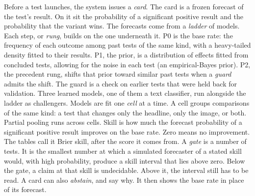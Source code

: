 \documentclass[sigconf,nonacm]{acmart}
\begin{document}
Before a test launches, the system issues a \emph{card}. The card is a frozen forecast of the test's result. On it sit the probability of a significant positive result and the probability that the variant wins. The forecasts come from a \emph{ladder} of models. Each step, or \emph{rung}, builds on the one underneath it. P0 is the base rate: the frequency of each outcome among past tests of the same kind, with a heavy-tailed density fitted to their results. P1, the prior, is a distribution of effects fitted from concluded tests, allowing for the noise in each test (an empirical-Bayes prior). P2, the precedent rung, shifts that prior toward similar past tests when a \emph{guard} admits the shift. The guard is a check on earlier tests that were held back for validation. Three learned models, one of them a text classifier, run alongside the ladder as challengers. Models are fit one \emph{cell} at a time. A cell groups comparisons of the same kind: a test that changes only the headline, only the image, or both. Partial pooling runs across cells. Skill is how much the forecast probability of a significant positive result improves on the base rate. Zero means no improvement. The tables call it Brier skill, after the score it comes from. A \emph{gate} is a number of tests. It is the smallest number at which a simulated forecaster of a stated skill would, with high probability, produce a skill interval that lies above zero. Below the gate, a claim at that skill is undecidable. Above it, the interval still has to be read. A card can also \emph{abstain}, and say why. It then shows the base rate in place of its forecast.
\end{document}
